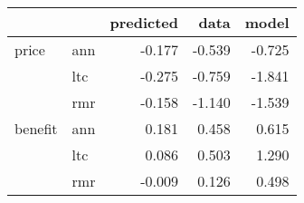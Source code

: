 \begin{tabular}{llrrr}
\toprule
        &     &  predicted &   data &  model \\
\midrule
price & ann &     -0.177 & -0.539 & -0.725 \\
        & ltc &     -0.275 & -0.759 & -1.841 \\
        & rmr &     -0.158 & -1.140 & -1.539 \\
benefit & ann &      0.181 &  0.458 &  0.615 \\
        & ltc &      0.086 &  0.503 &  1.290 \\
        & rmr &     -0.009 &  0.126 &  0.498 \\
\bottomrule
\end{tabular}
